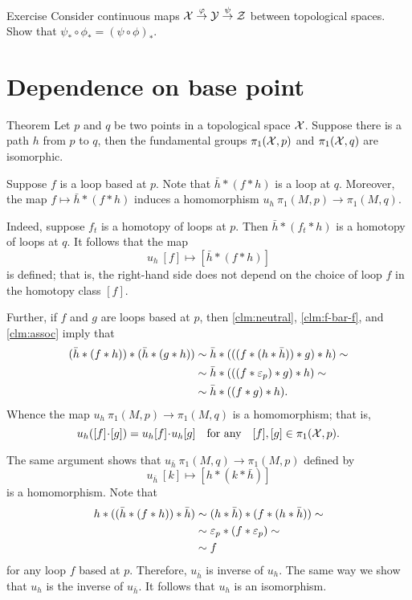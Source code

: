 \begin{thm}{Exercise}
Consider continuous maps 
$\mathcal{X}\stackrel{\varphi}{\to}\mathcal{Y}\stackrel{\psi}{\to}\mathcal{Z}$ between topological spaces.
Show that $\psi_*\circ\phi_*=(\psi\circ\phi)_*$.
\end{thm}

\section{Dependence on base point}

\begin{thm}{Theorem}
Let $p$ and $q$ be two points in a topological space $\mathcal{X}$.
Suppose there is a path $h$ from $p$ to $q$, then 
the fundamental groups $\pi_1(\mathcal{X},p)$ and $\pi_1(\mathcal{X},q)$ are isomorphic.
\end{thm}

Suppose $f$ is a loop based at $p$.
Note that $\bar h*(f*h)$ is a loop at $q$.
Moreover, the map $f\mapsto \bar h*(f*h)$ induces a homomorphism $u_h\:\pi_1(M,p)\to\pi_1(M,q)$.

Indeed, suppose $f_t$ is a homotopy of loops at $p$.
Then $\bar h*(f_t*h)$ is a homotopy of loops at $q$.
It follows that the map 
\[u_h\:[f]\mapsto [\bar h*(f*h)]\]
is defined; that is, the right-hand side does not depend on the choice of loop $f$ in the homotopy class $[f]$. 

Further, if $f$ and $g$ are loops based at $p$, then \ref{clm:neutral}, \ref{clm:f-bar-f}, and  \ref{clm:assoc} imply that
\begin{align*}
(\bar h*(f*h))*(\bar h*(g*h))&\sim \bar h*(((f*(h*\bar h))*g)*h)\sim
\\
&\sim \bar h*(((f*\varepsilon_p)*g)*h)\sim 
\\
&\sim \bar h*((f*g)*h).
\end{align*}
Whence the map $u_h\:\pi_1(M,p)\to \pi_1(M,q)$ is a homomorphism;
that is, 
\[u_h([f]\cdot [g])=u_h[f]\cdot u_h[g]\quad\text{for any}\quad [f],[g]\in \pi_1(\c{X},p).\]

The same argument shows that $u_{\bar h}\: \pi_1(M,q)\to \pi_1(M,p)$ defined by 
\[u_{\bar h}\:[k]\mapsto [h*(k*\bar h)]\]
is a homomorphism.
Note that 
\begin{align*}
h*((\bar h*(f*h))*\bar h)&\sim (h*\bar h)*(f*(h*\bar h))\sim
\\
&\sim \varepsilon_p*(f*\varepsilon_p)\sim
\\
&\sim f
\end{align*}
for any loop $f$ based at $p$.
Therefore, $u_{\bar h}$ is inverse of $u_h$.
The same way we show that $u_{h}$ is the inverse of $u_{\bar h}$.
It follows that $u_h$ is an isomorphism.
\qeds

